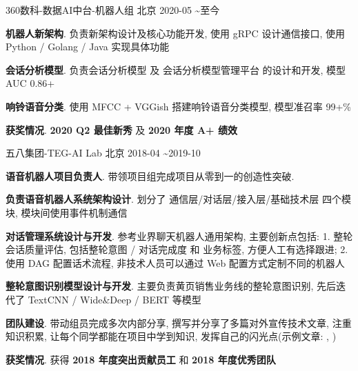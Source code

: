 


\begin{cventries}
	
	
	{360数科-数据AI中台-机器人组} %
	{北京} %
	{2020-05 \textasciitilde 至今}
	{ %
		\begin{cvitems}
			\item \textbf{机器人新架构}. 负责新架构设计及核心功能开发, 使用 gRPC 设计通信接口, 使用 Python / Golang / Java 实现具体功能
			\item \textbf{会话分析模型}. 负责会话分析模型 及 会话分析模型管理平台 的设计和开发, 模型 AUC 0.86+
			\item \textbf{响铃语音分类}. 使用 MFCC + VGGish 搭建响铃语音分类模型, 模型准召率 99+\%
			\item \textbf{获奖情况}. \textbf{2020 Q2 最佳新秀} 及 \textbf{2020 年度 A+ 绩效}
		\end{cvitems}
	}
	
	
	{五八集团-TEG-AI Lab} %
	{北京} %
	{2018-04 \textasciitilde 2019-10} %
	{ %
		\begin{cvitems}
			\item{\textbf{语音机器人项目负责人}. 带领项目组完成项目从零到一的创造性突破. }
			\item{\textbf{负责语音机器人系统架构设计}. 划分了 通信层/对话层/接入层/基础技术层 四个模块, 模块间使用事件机制通信}
			\item{\textbf{对话管理系统设计与开发}. 参考业界聊天机器人通用架构, 主要创新点包括: 1. 整轮会话质量评估, 包括整轮意图 / 对话完成度 和 业务标签, 方便人工有选择跟进;  2. 使用 DAG 配置话术流程, 非技术人员可以通过 Web 配置方式定制不同的机器人}
			\item{\textbf{整轮意图识别模型设计与开发}. 主要负责黄页销售业务线的整轮意图识别, 先后迭代了 TextCNN / Wide\&Deep / BERT 等模型}
			\item{\textbf{团队建设}. 带动组员完成多次内部分享, 撰写并分享了多篇对外宣传技术文章, 注重知识积累, 让每个同学都能在项目中学到知识, 发挥自己的闪光点(示例文章: , ) }
			\item{\textbf{获奖情况}. 获得 \textbf{2018 年度突出贡献员工} 和 \textbf{2018 年度优秀团队}}
		\end{cvitems}
	}
	

\end{cventries}
